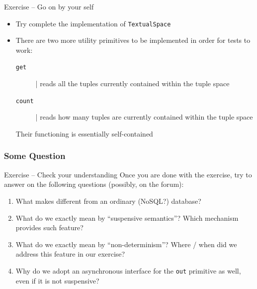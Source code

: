 \documentclass[presentation]{beamer}\mode<presentation>{\usetheme{AMSCesenaPurpleAndGold}}
\begin{document}
\begin{frame}{Exercise \currentExercise{} -- Go on by your self}
\begin{itemize}
	\item Try complete the implementation of \texttt{TextualSpace}
	
	\vfill
	
	\item There are two more utility primitives to be implemented in order for tests to work:
	\begin{description}
		\item[\texttt{get}] | reads \alert{all} the tuples currently contained within the tuple space 
		\item[\texttt{count}] | reads \alert{how many} tuples are currently contained within the tuple space 
	\end{description}
	Their functioning is essentially self-contained
	
\end{itemize}
\end{frame}

\subsubsection{Some Question}

\begin{frame}{Exercise \currentExercise{} -- Check your understanding}
Once you are done with the exercise, try to answer on the following questions (possibly, on the forum):
%
\vfill
%
\begin{enumerate}
	\item What makes \linda{} different from an ordinary (NoSQL?) database?
	
	\vfill
	
	\item What do we exactly mean by ``\alert{suspensive semantics}''? Which mechanism provides such feature?
	
	\vfill
	
	\item What do we exactly mean by ``\alert{non-determinism}''? Where / when did we address this feature in our exercise?
	
	\vfill
	
	\item Why do we adopt an asynchronous interface for the \texttt{\alert{out}} primitive as well, even if it is not suspensive?
	
\end{enumerate}
\end{frame}
\end{document}
